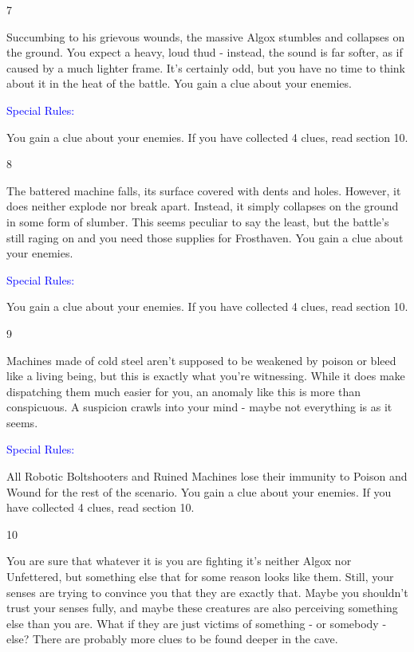 \documentclass[fontsize=11pt]{scrartcl}
\begin{document}
\begin{multicols}{3}
\begin{center}
		  {\myfont\large{\textcolor{Sepia}{7}}}
		\end{center}
		\footnotesize{Succumbing to his grievous wounds, the massive Algox stumbles and collapses on the ground. You expect a heavy, loud thud - instead, the sound is far softer, as if caused by a much lighter frame. It’s certainly odd, but you have no time to think about it in the heat of the battle. You gain a clue about your enemies.}
		\begin{center}
	    {\myfont\normalsize{\textcolor{Blue}{Special Rules:}}}
		\end{center}
		\footnotesize{You gain a clue about your enemies. If you have collected 4 clues, read section 10.}
		\begin{center}
		  {\myfont\large{\textcolor{Sepia}{8}}}
		\end{center}
		\footnotesize{The battered machine falls, its surface covered with dents and holes. However, it does neither explode nor break apart. Instead, it simply collapses on the ground in some form of slumber. This seems peculiar to say the least, but the battle’s still raging on and you need those supplies for Frosthaven. You gain a clue about your enemies.}
		\begin{center}
	    {\myfont\normalsize{\textcolor{Blue}{Special Rules:}}}
		\end{center}
		\footnotesize{You gain a clue about your enemies. If you have collected 4 clues, read section 10.}
		\begin{center}
		  {\myfont\large{\textcolor{Sepia}{9}}}
		\end{center}
		\footnotesize{Machines made of cold steel aren’t supposed to be weakened by poison or bleed like a living being, but this is exactly what you’re witnessing. While it does make dispatching them much easier for you, an anomaly like this is more than conspicuous. A suspicion crawls into your mind - maybe not everything is as it seems.}
		\begin{center}
	    {\myfont\normalsize{\textcolor{Blue}{Special Rules:}}}
		\end{center}
		\footnotesize{All Robotic Boltshooters and Ruined Machines lose their immunity to Poison and Wound for the rest of the scenario. You gain a clue about your enemies. If you have collected 4 clues, read section 10.}
		\begin{center}
		  {\myfont\large{\textcolor{Sepia}{10}}}
		\end{center}
		\footnotesize{You are sure that whatever it is you are fighting it’s neither Algox nor Unfettered, but something else that for some reason looks like them. Still, your senses are trying to convince you that they are exactly that. Maybe you shouldn’t trust your senses fully, and maybe these creatures are also perceiving something else than you are. What if they are just victims of something - or somebody - else? There are probably more clues to be found deeper in the cave.}

\end{multicols}
\end{document}
